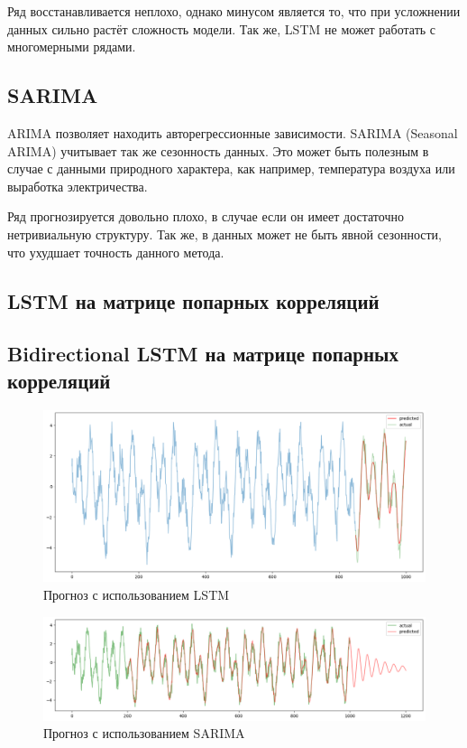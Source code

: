 \documentclass{article}
\begin{document}
Ряд восстанавливается неплохо, однако минусом является то, что при усложнении данных сильно растёт сложность модели. Так же, LSTM не может работать с многомерными рядами.

\subsection{SARIMA}

ARIMA позволяет находить авторегрессионные зависимости. SARIMA (Seasonal ARIMA) учитывает так же сезонность данных. Это может быть полезным в случае с данными природного характера, как например, температура воздуха или выработка электричества.

Ряд прогнозируется довольно плохо, в случае если он имеет достаточно нетривиальную структуру. Так же, в данных может не быть явной сезонности, что ухудшает точность данного метода.

\subsection{LSTM на матрице попарных корреляций}

\subsection{Bidirectional LSTM на матрице попарных корреляций}



\begin{figure}
	\centering
	\includegraphics[width=\textwidth]{LSTM-prediction.png}
	\caption{Прогноз с использованием LSTM}
	\label{fig:fig1}
\end{figure}
\begin{figure}
	\centering
	\includegraphics[width=\textwidth]{SARIMA-prediction.png}
	\caption{Прогноз с использованием SARIMA}
	\label{fig:fig2}
\end{figure}



\end{document}
